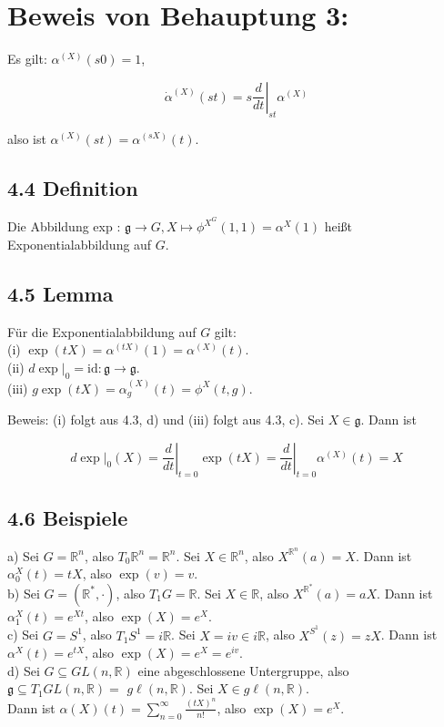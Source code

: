 \documentclass[10pt, letterpaper]{article}
\begin{document}
\section*{Beweis von Behauptung 3:}
Es gilt: $\alpha^{(X)}(s 0)=1$,

$$
\dot{\alpha}^{(X)}(s t)=\left.s \frac{d}{d t}\right|_{s t} \alpha^{(X)}
$$

also ist $\alpha^{(X)}(s t)=\alpha^{(s X)}(t)$.

\subsection*{4.4 Definition}
Die Abbildung exp : $\mathfrak{g} \rightarrow G, X \mapsto \phi^{X^{G}}(1,1)=\alpha^{X}(1)$ heißt Exponentialabbildung auf $G$.

\subsection*{4.5 Lemma}
Für die Exponentialabbildung auf $G$ gilt:\\
(i) $\exp (t X)=\alpha^{(t X)}(1)=\alpha^{(X)}(t)$.\\
(ii) $\left.d \exp \right|_{0}=\mathrm{id}: \mathfrak{g} \rightarrow \mathfrak{g}$.\\
(iii) $g \exp (t X)=\alpha_{g}^{(X)}(t)=\phi^{X}(t, g)$.

Beweis: (i) folgt aus 4.3, d) und (iii) folgt aus 4.3, c). Sei $X \in \mathfrak{g}$. Dann ist

$$
\left.d \exp \right|_{0}(X)=\left.\frac{d}{d t}\right|_{t=0} \exp (t X)=\left.\frac{d}{d t}\right|_{t=0} \alpha^{(X)}(t)=X
$$

\subsection*{4.6 Beispiele}
a) Sei $G=\mathbb{R}^{n}$, also $T_{0} \mathbb{R}^{n}=\mathbb{R}^{n}$. Sei $X \in \mathbb{R}^{n}$, also $X^{\mathbb{R}^{n}}(a)=X$. Dann ist $\alpha_{0}^{X}(t)=t X$, also $\exp (v)=v$.\\
b) Sei $G=\left(\mathbb{R}^{*}, \cdot\right)$, also $T_{1} G=\mathbb{R}$. Sei $X \in \mathbb{R}$, also $X^{\mathbb{R}^{*}}(a)=a X$. Dann ist $\alpha_{1}^{X}(t)=e^{X t}$, also $\exp (X)=e^{X}$.\\
c) Sei $G=S^{1}$, also $T_{1} S^{1}=i \mathbb{R}$. Sei $X=i v \in i \mathbb{R}$, also $X^{S^{1}}(z)=z X$. Dann ist $\alpha^{X}(t)=e^{t X}$, also $\exp (X)=e^{X}=e^{i v}$.\\
d) Sei $G \subseteq G L(n, \mathbb{R})$ eine abgeschlossene Untergruppe, also $\mathfrak{g} \subseteq T_{1} G L(n, \mathbb{R})=$ $g \ell(n, \mathbb{R})$. Sei $X \in g \ell(n, \mathbb{R})$.\\
Dann ist $\alpha(X)(t)=\sum_{n=0}^{\infty} \frac{(t X)^{n}}{n!}$, also $\exp (X)=e^{X}$.
\end{document}
